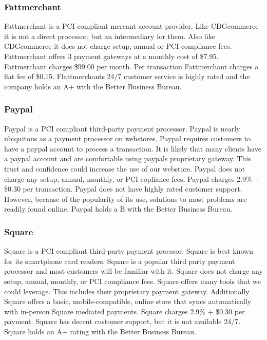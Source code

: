 \documentclass[letterpaper]{article}
\begin{document}
      \subsubsection{Fattmerchant}
        Fattmerchant is a PCI compliant mercant account provider. Like CDGcommerce it is not a direct processor, but an intermediary for them.
        Also like CDGcommerce it does not charge setup, annual or PCI compliance fees. Fattmerchant offers 3 payment gateways at a monthly cost of \$7.95.
        Fattmerchant charges \$99.00 per month. Per transaction Fattmerchant charges a flat fee of \$0.15. Flattmerchants 24/7 customer service is highly rated
        and the company holds an A+ with the Better Business Bureau.
      \subsubsection{Paypal}
        Paypal is a PCI compliant third-party payment processor. Paypal is nearly ubiquitous as a payment processor on webstores. Paypal requires customers to have a paypal account to process a transaction.
        It is likely that many clients have a paypal account and are comfortable using paypals proprietary gateway. This trust and confidence
        could increase the use of our webstore. Paypal does not charge any setup, annual, monthly, or PCI copliance fees. Paypal charges 2.9\% + \$0.30 per transaction.
        Paypal does not have highly rated customer support. However, because of the popularity of its use, solutions to most problems are readily found online. Paypal holds a
        B with the Better Business Bureau.
      \subsubsection{Square}
        Square is a PCI compliant third-party payment proessor. Square is best known for its smartphone card readers. Square is a popular third party payment processor and most customers will be
        familiar with it. Square does not charge any setup, annual, monthly, or PCI compliance fees. Square offers many tools that we could leverage.
        This includes their proprietary payment gateway. Additionally Square offers a basic, mobile-compatible, online store that syncs automatically with in-person Square mediated payments.
        Square charges 2.9\% + \$0.30 per payment. Square has decent customer support, but it is not available 24/7. Square holds an A+ rating with the Better Business Bureau.
\end{document}
